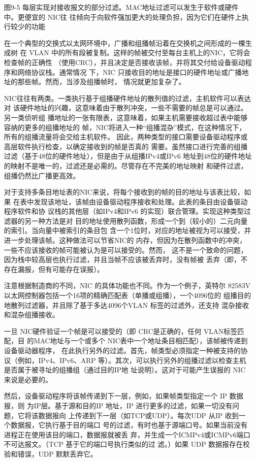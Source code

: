 图9-5 每层实现对接收报文的部分过滤。MAC地址过滤可以发生于软件或硬件中。更便宜的 NIC往
往倾向于向软件强加更大的处理负担，因为它们在硬件上执行较少的功能

在一个典型的交换式以太网环境中，广播和组播帧沿着在交换机之间形成的一棵生成树
在 VLAN 中的所有段被复制。这样的帧被交付至每台主机上的NIC，它将会检查帧的正确性
（使用CRC），并且决定是否接收该帧，并将其交付给设备驱动程序和网络协议栈。通常情况
下，NIC 只接收目的地址是接口的硬件地址或广播地址的那些帧。然而，当涉及组播帧时，
情况就更加复杂了。

NIC往往有两类。一类执行基于组播硬件地址的散列值的过滤，主机软件可以表达对
该硬件地址的兴趣，这意味着由于散列冲突，一些不需要的帧总是可以通过。另一类侦听组
播地址的一张有限表，这意味着，如果主机需要接收超过表中能够容纳的更多的组播地址的
帧，NIC将进入一种“组播混杂”模式，在这种情况下，所有的组播流量将会交给主机软件。
因此，两种类型的接口需要设备驱动程序或高层软件执行检查，以确定接收到的帧是否真的
需要。虽然接口进行完善的组播过滤（基于48位的硬件地址），但是由于从组播IPv4或IPv6
地址到48位的硬件地址的映射不是唯一的，过滤还是必需的。尽管存在不完美的地址映射
和硬件过滤，组播仍然比广播更高效。

对于支持多条目地址表的NIC来说，将每个接收到的帧的目的地址与该表比较，如果
在表中发现该地址，该帧由设备驱动程序接收和处理。此表的条目由设备驱动程序软件和协
议栈的其他层（如IPv4和IPv6 的实现）联合管理。实现这种类型过滤器的另一种方法是对
目的地址使用散列函数，形成一个到（较小的）二元向量的索引。当向量中被索引的条目包
含一个1位时，对应的地址被视为可以接受，并进一步处理该帧。这种做法可以节省NIC的
内存，但因为在散列函数中的冲突，一些不应该接收的帧可能被认为是可以接受的。然而，
这不是一个致命的问题，因为栈中较高层也执行过滤，并且当帧不应该被丢弃时，没有帧被
丢弃（即，不存在漏报，但有可能存在误报）。

注意根据制造商的不同，NIC 的具体功能也不同。作为一个例子，英特尔
82583V以太网控制器包括一个16项的精确匹配表（单播或组播），一个4096位的
组播目的地散列过滤器，并且除了基于多达4096个VLAN 标签的过滤外，还支持
混杂接收和混杂组播接收。

一旦 NIC硬件验证一个帧是可以接受的（即 CRC是正确的，任何 VLAN标签匹配，目
的MAC地址与一个或多个 NIC表中一个地址条目相匹配），该帧被传递到设备驱动器程序，
在此执行另外的过滤。首先，帧类型必须指定一种被支持的协议（例如，IPv4、IPv6、ARP
等）。其次，可以执行另外的组播过滤以检查主机是否属于被寻址的组播组（通过目的IP地
址说明）。这对于可能产生误报的 NIC来说是必要的。

然后，设备驱动程序将该帧传递到下一层，例如，如果帧类型指定一个 IP 数据报，则
为IP层。基于源和目的IP 地址，IP 进行更多的过滤，如果一切没有问题，它将该数据报向
上传递到下一层（如TCP或UDP）。每次UDP 从IP 收到一个数据报，它执行基于目的端口
号的过滤，有时也基于源端口号。如果当前没有进程正在使用该目的端口，数据报就被丢
弃，并生成一个ICMPv4或ICMPv6端口不可达报文。（TCP 基于它的端口号执行类似的过
滤。）如果 UDP 数据报存在校验和错误，UDP 默默丢弃它。

